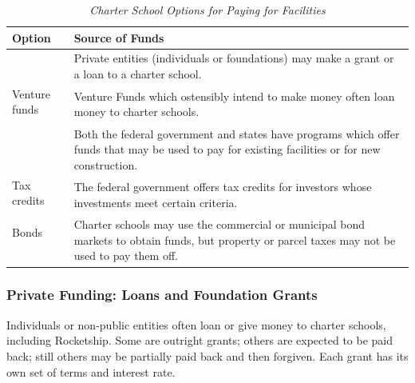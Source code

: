 \begin{table}[ht]
  \caption[Charter School Options for Paying for Facilities]{\textit{Charter School Options for Paying for Facilities}}%
  \label{tab:paying-for-facilities}%
  \begin{tabular}{ll}
    \toprule%
    \textbf{Option}    & \textbf{Source of Funds} \\
    \midrule%
    \protect\medskip%
    \multirow[t]{2}{1.25in}{Private grants or loans} & \multirow[t]{2}{4.25in}{Private entities (individuals or foundations) may make a grant or a loan to  a charter school.}\\\\ %
    \protect\medskip%
    Venture funds & \multirow[t]{2}{4.25in}{Venture Funds which ostensibly intend to make money often loan money to charter schools.}\\\\
    \protect\medskip%
    \multirow[t]{3}{1.25in}{Federal or state grants} & \multirow[t]{3}{4.25in}{Both the federal government and states have programs which offer funds that may be used to pay for existing facilities or for new construction.}\\\\\\
    \protect\medskip%
    Tax credits & \multirow[t]{2}{4.25in}{The federal government offers tax credits for investors whose investments meet
certain criteria.}\\\\
    Bonds & \multirow[t]{3}{4.25in}{Charter schools may use the commercial or municipal bond markets to obtain funds, but property or parcel taxes may not be used to pay them off.}\\\\\\
    \bottomrule%
  \end{tabular}
\end{table}

\subsubsection{Private Funding: Loans and Foundation Grants}\label{sec:private-funding}\indent%

Individuals or non-public entities often loan or give money to charter schools, including Rocketship. Some are outright grants; others are expected to be paid back; still others may be partially paid back and then forgiven. Each grant has its own set of terms and interest rate.

